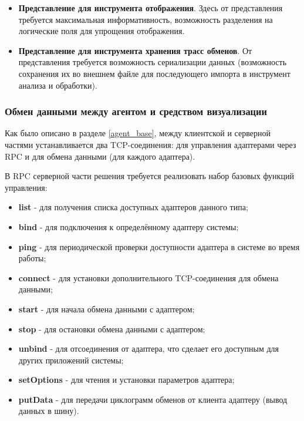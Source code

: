 \begin{itemize}
 \item \textbf{Представление для инструмента отображения}. Здесь от представления требуется максимальная информативность, возможность разделения на логические поля для упрощения отображения.
 \item \textbf{Представление для инструмента хранения трасс обменов}. От представления требуется возможность сериализации данных (возможность сохранения их во внешнем файле для последующего импорта в инструмент анализа и обработки).
\end{itemize}

\subsubsection{Обмен данными между агентом и средством визуализации}

Как было описано в разделе \ref{agent_base}, между клиентской и серверной частями устанавливается два TCP-соединения: для управления адаптерами через RPC и для обмена данными (для каждого адаптера).

В RPC серверной части решения требуется реализовать набор базовых функций управления:

\label{agent_proc_list}

\begin{itemize}
 \item \textbf{list} - для получения списка доступных адаптеров данного типа;
 \item \textbf{bind} - для подключения к определённому адаптеру системы;
 \item \textbf{ping} - для периодической проверки доступности адаптера в системе во время работы;
 \item \textbf{connect} - для установки дополнительного TCP-соединения для обмена данными;
 \item \textbf{start} - для начала обмена данными с адаптером;
 \item \textbf{stop} - для остановки обмена данными с адаптером;
 \item \textbf{unbind} - для отсоединения от адаптера, что сделает его доступным для других приложений системы;
 \item \textbf{setOptions} - для чтения и установки параметров адаптера;
 \item \textbf{putData} - для передачи циклограмм обменов от клиента адаптеру (вывод данных в шину).
\end{itemize}


